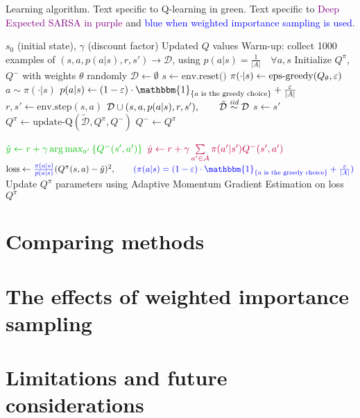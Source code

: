 \documentclass{article}
\begin{document}
\begin{algorithm}
    \caption{Learning algorithm. Text specific to \textcolor{dgreen}{Q-learning in green}. Text specific to \textcolor{purple}{Deep Expected SARSA in purple} and \textcolor{blue}{blue when weighted importance sampling is used}.}
    \begin{algorithmic}[1]
        \Require $s_0$ (initial state), $\gamma$ (discount factor)
        \Ensure Updated $Q$ values
        \State Warm-up: collect 1000 examples of $(s, a, p(a|s), r, s') \rightarrow \mathcal{D}$, using $p(a|s) = \frac{1}{|A|} \quad \forall a, s$
        \State Initialize $Q^\pi$, $Q^-$ with weights \(\theta\) randomly
        \State \(\mathcal{D} \gets \emptyset\)
        \Repeat
            \State $s \gets \text{env.reset()}$
            \Repeat
                \State $\pi(\cdot | s) \gets \text{eps-greedy}(Q_\theta, \varepsilon)$
                \State $a \sim \pi(\cdot|s)$
                \State $p(a|s) \gets (1 - \eps) \cdot \mathbbm{1}_{\set{a\text{ is the greedy choice}}} + \frac{\eps}{|A|}$
                \State $r, s' \gets \text{env.step}(s, a)$
                \State $\mathcal{D} \cup (s, a, p(a|s), r, s'),\qquad \tilde{\mathcal{D}} \overset{\textit{iid}}{\sim}\mathcal{D}$
                \State $s \gets s'$
                \State $Q^\pi \gets \text{update-Q}(\tilde{\mathcal{D}}, Q^\pi, Q^-)$
                    \State $Q^- \gets Q^\pi$
                \EndIf
        
                \State $\textcolor{dgreen}{\hat{y} \gets r + \gamma \arg\max_{a'}\set{Q^-(s',a')}}$
                \State $\textcolor{purple}{\hat{y} \gets r + \gamma \sum\limits_{a' \in \mathcal{A}} \pi(a' | s') Q^-(s', a')}$
                \State $\text{loss} \gets \textcolor{blue}{\frac{\pi(a|s)}{p(a|s)}}(Q^\pi(s, a) - \hat{y})^2, \qquad \textcolor{blue}{(\pi(a|s) = (1 - \eps) \cdot \mathbbm{1}_{\set{a\text{ is the greedy choice}}} + \frac{\eps}{|A|})}$
                \State Update $Q^\pi$ parameters using Adaptive Momentum Gradient Estimation on loss
            \EndFor
            \State \Return $Q^\pi$
        \EndProcedure
    \end{algorithmic}
\end{algorithm}

\section{Comparing methods}
\section{The effects of weighted importance sampling}
\section{Limitations and future considerations}
\end{document}
